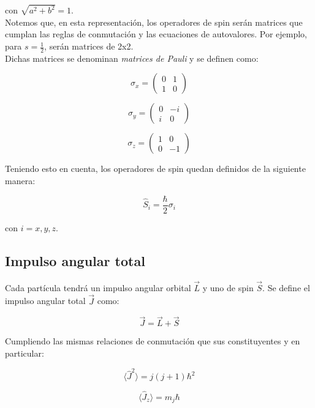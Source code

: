 \documentclass[a4paper]{article}
\begin{document}
con $\sqrt{a^{2} + b^{2}} = 1$.\\

Notemos que, en esta representaci\'on, los operadores de spin ser\'an matrices que cumplan las reglas de conmutaci\'on y las ecuaciones de autovalores. Por ejemplo, para $s = \frac{1}{2}$, ser\'an matrices de 2x2.\\

Dichas matrices se denominan \textit{matrices de Pauli} y se definen como:

$$ \sigma_{x} = \begin{pmatrix} 
    		0 & 1 \\ 
    		1 & 0
    		\end{pmatrix} $$
		
$$ \sigma_{y} = \begin{pmatrix} 
    		0 & -i \\ 
    		i & 0
    		\end{pmatrix} $$

$$ \sigma_{z} = \begin{pmatrix} 
    		1 & 0 \\ 
    		0 & -1
    		\end{pmatrix} $$

Teniendo esto en cuenta, los operadores de spin quedan definidos de la siguiente manera:

\begin{equation}
\label{eq:si1/2}
\hat{S}_{i} = \frac{\hbar}{2}\sigma_{i}
\end{equation}

con $i = x, y, z$.

\subsection{Impulso angular total}

Cada part\'icula tendr\'a un impulso angular orbital $\vec{L}$ y uno  de spin $\vec{S}$. Se define el impulso angular total $\vec{J}$ como:

$$ \vec{J} = \vec{L} + \vec{S}$$

Cumpliendo las mismas relaciones de conmutaci\'on que sus constituyentes y en particular:

\begin{equation}
\label{eq:J2}
\langle \hat{J}^{2} \rangle = j(j+1)\hbar^{2}
\end{equation}

\begin{equation}
\label{eq:Jz}
\langle \hat{J}_{z}\rangle = m_{j}\hbar
\end{equation}
\end{document}
